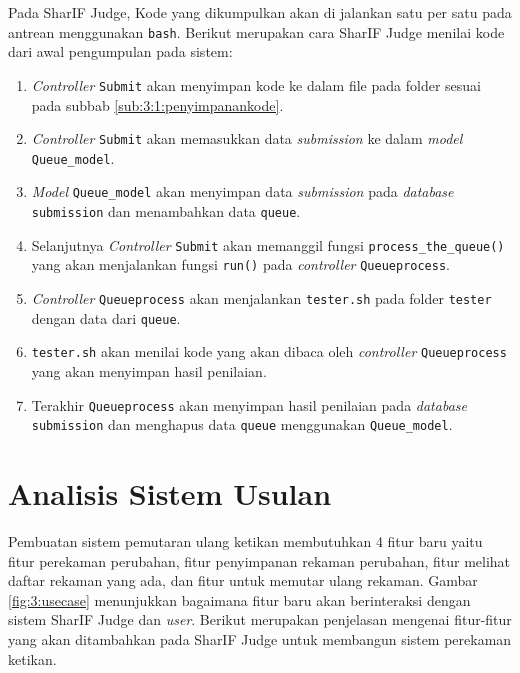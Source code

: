 Pada SharIF Judge, Kode yang dikumpulkan akan di jalankan satu per satu pada antrean menggunakan \verb|bash|. Berikut merupakan cara SharIF Judge menilai kode dari awal pengumpulan pada sistem:

\begin{enumerate}
	\item \textit{Controller} \verb|Submit| akan menyimpan kode ke dalam file pada folder sesuai pada subbab \ref{sub:3:1:penyimpanankode}.
	\item \textit{Controller} \verb|Submit| akan memasukkan data \textit{submission} ke dalam \textit{model} \verb|Queue_model|.
	\item \textit{Model} \verb|Queue_model| akan menyimpan data \textit{submission} pada \textit{database} \verb|submission| dan menambahkan data \verb|queue|.
	\item Selanjutnya \textit{Controller} \verb|Submit| akan memanggil fungsi \verb|process_the_queue()| yang akan menjalankan fungsi \verb|run()| pada \textit{controller} \verb|Queueprocess|.
	\item \textit{Controller} \verb|Queueprocess| akan menjalankan \verb|tester.sh| pada folder \verb|tester| dengan data dari \verb|queue|.
	\item \verb|tester.sh| akan menilai kode yang akan dibaca oleh \textit{controller} \verb|Queueprocess| yang akan menyimpan hasil penilaian.
	\item Terakhir \verb|Queueprocess| akan menyimpan hasil penilaian pada \textit{database} \verb|submission| dan menghapus data \verb|queue| menggunakan \verb|Queue_model|.
\end{enumerate}


\section{Analisis Sistem Usulan}
\label{sec:3:sistemusulan}

Pembuatan sistem pemutaran ulang ketikan membutuhkan 4 fitur baru yaitu fitur perekaman perubahan, fitur penyimpanan rekaman perubahan, fitur melihat daftar rekaman yang ada, dan fitur untuk memutar ulang rekaman. Gambar \ref{fig:3:usecase} menunjukkan bagaimana fitur baru akan berinteraksi dengan sistem SharIF Judge dan \textit{user}. Berikut merupakan penjelasan mengenai fitur-fitur yang akan ditambahkan pada SharIF Judge untuk membangun sistem perekaman ketikan.

